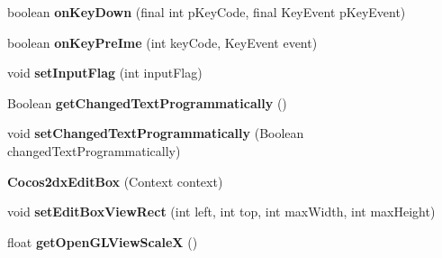 \begin{DoxyCompactItemize}
\item 
\mbox{\label{classorg_1_1cocos2dx_1_1lib_1_1Cocos2dxEditBox_a977dc420dcaa8b34afaa94230071ecf7}} 
boolean {\bfseries on\+Key\+Down} (final int p\+Key\+Code, final Key\+Event p\+Key\+Event)
\item 
\mbox{\label{classorg_1_1cocos2dx_1_1lib_1_1Cocos2dxEditBox_aac0c09da511a252acb0edc7e81c2a370}} 
boolean {\bfseries on\+Key\+Pre\+Ime} (int key\+Code, Key\+Event event)
\item 
\mbox{\label{classorg_1_1cocos2dx_1_1lib_1_1Cocos2dxEditBox_ab8c46d40e9f2cc6759eff41c7ad548f5}} 
void {\bfseries set\+Input\+Flag} (int input\+Flag)
\item 
\mbox{\label{classorg_1_1cocos2dx_1_1lib_1_1Cocos2dxEditBox_ac29536d2ea187ac8c55d65c05645fa26}} 
Boolean {\bfseries get\+Changed\+Text\+Programmatically} ()
\item 
\mbox{\label{classorg_1_1cocos2dx_1_1lib_1_1Cocos2dxEditBox_ae001dcf37fdfcb9fa4f64fbb27c1dfa1}} 
void {\bfseries set\+Changed\+Text\+Programmatically} (Boolean changed\+Text\+Programmatically)
\item 
\mbox{\label{classorg_1_1cocos2dx_1_1lib_1_1Cocos2dxEditBox_ad70484f13e1482147cc885f086e94e1d}} 
{\bfseries Cocos2dx\+Edit\+Box} (Context context)
\item 
\mbox{\label{classorg_1_1cocos2dx_1_1lib_1_1Cocos2dxEditBox_aedf5d4cd6c912debf2c7364f1dd1827a}} 
void {\bfseries set\+Edit\+Box\+View\+Rect} (int left, int top, int max\+Width, int max\+Height)
\item 
\mbox{\label{classorg_1_1cocos2dx_1_1lib_1_1Cocos2dxEditBox_a13e14bdb44883e31616fbd224a1c2560}} 
float {\bfseries get\+Open\+G\+L\+View\+ScaleX} ()
\item 
\mbox{\label{classorg_1_1cocos2dx_1_1lib_1_1Cocos2dxEditBox_a1df068f07961e7fac0dc1983b53015d2}} 

\end{DoxyCompactItemize}

